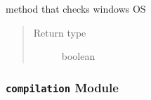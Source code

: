 \documentclass[a4paper,10pt,english]{sphinxmanual}
\begin{document}

\begin{fulllineitems}
\label{commands/apidoc/src:src.architecture.is_windows}
method that checks windows OS
\begin{quote}\begin{description}
\item[{Return type}] \leavevmode
boolean

\end{description}\end{quote}

\end{fulllineitems}



\subsubsection{\texttt{compilation} Module}
\label{commands/apidoc/src:module-src.compilation}\label{commands/apidoc/src:compilation-module}
\end{document}
